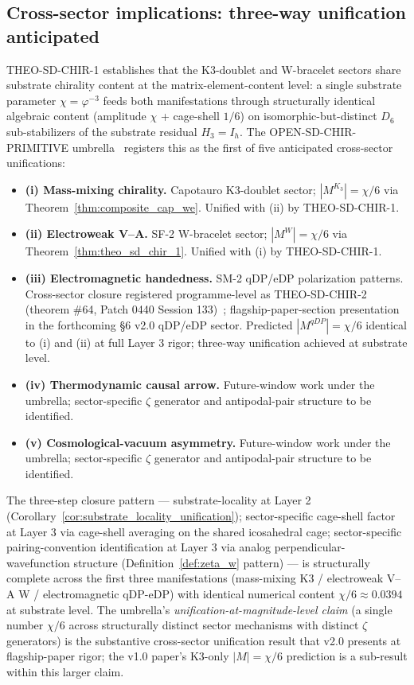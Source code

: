 \documentclass[11pt,letterpaper]{article}
\newcommand{\phig}{\varphi}
\newcommand{\Kthree}{\ensuremath{K_3}}
\newcommand{\Dsix}{D_6}
\begin{document}
\subsection{Cross-sector implications: three-way unification anticipated}\label{sec:cross_sector_w_implications}

THEO-SD-CHIR-1 establishes that the K3-doublet and W-bracelet sectors share substrate chirality content at the matrix-element-content level: a single substrate parameter $\chi = \phig^{-3}$ feeds both manifestations through structurally identical algebraic content (amplitude $\chi$ + cage-shell $1/6$) on isomorphic-but-distinct $\Dsix$ sub-stabilizers of the substrate residual $H_3 = I_h$. The OPEN-SD-CHIR-PRIMITIVE umbrella~\cite{abshier_research_frontier} registers this as the first of five anticipated cross-sector unifications:

\begin{itemize}\setlength\itemsep{0.2em}
    \item \textbf{(i) Mass-mixing chirality.} Capotauro K3-doublet sector; $|M^{\Kthree}| = \chi/6$ via Theorem~\ref{thm:composite_cap_we}. Unified with (ii) by THEO-SD-CHIR-1.
    \item \textbf{(ii) Electroweak V--A.} SF-2 W-bracelet sector; $|M^W| = \chi/6$ via Theorem~\ref{thm:theo_sd_chir_1}. Unified with (i) by THEO-SD-CHIR-1.
    \item \textbf{(iii) Electromagnetic handedness.} SM-2 qDP/eDP polarization patterns. Cross-sector closure registered programme-level as THEO-SD-CHIR-2 (theorem \#64, Patch 0440 Session 133)~\cite{abshier_theorem_registry}; flagship-paper-section presentation in the forthcoming \S6 v2.0 qDP/eDP sector. Predicted $|M^{qDP}| = \chi/6$ identical to (i) and (ii) at full Layer 3 rigor; three-way unification achieved at substrate level.
    \item \textbf{(iv) Thermodynamic causal arrow.} Future-window work under the umbrella; sector-specific $\zeta$ generator and antipodal-pair structure to be identified.
    \item \textbf{(v) Cosmological-vacuum asymmetry.} Future-window work under the umbrella; sector-specific $\zeta$ generator and antipodal-pair structure to be identified.
\end{itemize}

The three-step closure pattern --- substrate-locality at Layer 2 (Corollary~\ref{cor:substrate_locality_unification}); sector-specific cage-shell factor at Layer 3 via cage-shell averaging on the shared icosahedral cage; sector-specific pairing-convention identification at Layer 3 via analog perpendicular-wavefunction structure (Definition~\ref{def:zeta_w} pattern) --- is structurally complete across the first three manifestations (mass-mixing K3 / electroweak V--A W / electromagnetic qDP-eDP) with identical numerical content $\chi/6 \approx 0.0394$ at substrate level. The umbrella's \emph{unification-at-magnitude-level claim} (a single number $\chi/6$ across structurally distinct sector mechanisms with distinct $\zeta$ generators) is the substantive cross-sector unification result that v2.0 presents at flagship-paper rigor; the v1.0 paper's K3-only $|M| = \chi/6$ prediction is a sub-result within this larger claim.
\end{document}
